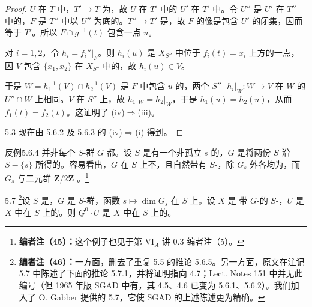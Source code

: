 \begin{proof}
$U$ 在 $T$ 中，$T'\to T$ 为，故 $U$ 在 $T'$ 中的 $U'$ 在 $T'$ 中。令 $U''$ 是 $U'$ 在 $T''$ 中的，$F$ 是 $T''$ 中以 $\overline{U''}$ 为底的。$T''\to T'$ 是，故 $F$ 的像是包含 $U'$ 的闭集，因而等于 $T'$。所以 $F\cap g^{-1}(t)$ 包含一点 $u$。

对 $i=1,2$，令 $h_i=f_i''|_F$。则 $h_i(u)$ 是 $X_{S''}$ 中位于 $f_i(t)=x_i$ 上方的一点，因 $V$ 包含 $\{x_1,x_2\}$ 在 $X_{S''}$ 中的，故 $h_i(u)\in V$。

于是 $W=h_1^{-1}(V)\cap h_2^{-1}(V)$ 是 $F$ 中包含 $u$ 的，两个 $S''$- $h_i|_W:W\to V$ 在 $W$ 的 $U''\cap W$ 上相同。$V$ 在 $S''$ 上，故 $h_1|_W=h_2|_W$，于是 $h_1(u)=h_2(u)$，从而 $f_1(t)=f_2(t)$。这证明了 (iv)$\Rightarrow$(iii)。

 5.3 现在由 5.6.2 及 5.6.3 的 (iv)$\Rightarrow$(i) 得到。
\end{proof}
\begin{SGAresult}{反例}{5.6.4}
并非每个 $S$-群 $G$ 都。设 $S$ 是有一个非孤立 $s$ 的，$G$ 是将两份 $S$ 沿 $S-\{s\}$ 所得的。容易看出，$G$ 在 $S$ 上不，且自然带有 $S$-，除 $G_s$ 外各均为，而 $G_s$ 与二元群 $\mathbf Z/2\mathbf Z$ 。\footnote{\textbf{编者注（45）：}这个例子也见于第 VI$_A$ 讲 0.3 编者注（5）。}
\end{SGAresult}
\begin{SGAresult}{}{5.7}
\footnote{\textbf{编者注（46）：}一方面，删去了重复 5.5 的推论 5.6.5。另一方面，原文在注记 5.7 中陈述了下面的推论 5.7.1，并将证明指向 4.7；Lect. Notes 151 中并无此编号（但 1965 年版 SGAD 中有，其 4.5、4.6 已变为 5.6.1、5.6.2）。我们加入了 O. Gabber 提供的 5.7，它使 SGAD 的上述陈述更为精确。}设 $S$ 是，$G$ 是 $S$-群，函数 $s\mapsto\dim G_s$ 在 $S$ 上。设 $X$ 是
带 $G$-的 $S$-，$U$ 是 $X$ 中在 $S$ 上的。则 $\underline G^0\cdot U$ 是 $X$ 中在 $S$ 上的。
\end{SGAresult}
